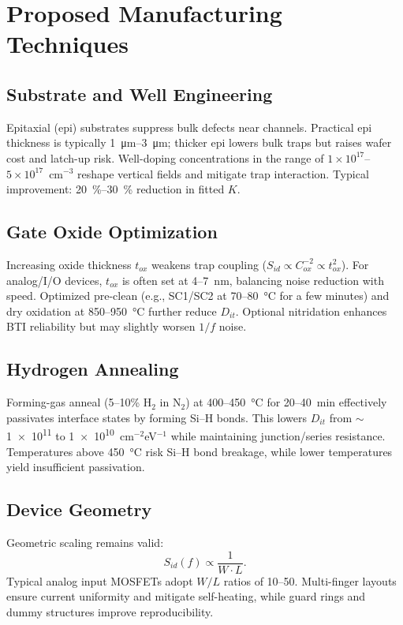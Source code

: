 \documentclass[conference]{IEEEtran}
\begin{document}
\section{Proposed Manufacturing Techniques}

\subsection{Substrate and Well Engineering}
Epitaxial (epi) substrates suppress bulk defects near channels. 
Practical epi thickness is typically \SIrange{1}{3}{\micro\meter}; thicker epi lowers bulk traps but raises wafer cost and latch-up risk. 
Well-doping concentrations in the range of $1\times10^{17}$--$5\times10^{17}$~cm$^{-3}$ reshape vertical fields and mitigate trap interaction. 
Typical improvement: \SI{20}{\percent}--\SI{30}{\percent} reduction in fitted $K$.

\subsection{Gate Oxide Optimization}
Increasing oxide thickness $t_{ox}$ weakens trap coupling 
($S_{id}\!\propto\! C_{ox}^{-2}\!\propto\! t_{ox}^{2}$). 
For analog/I/O devices, $t_{ox}$ is often set at 4--7~nm, balancing noise reduction with speed. 
Optimized pre-clean (e.g., SC1/SC2 at 70--80~\si{\celsius} for a few minutes) and dry oxidation at 850--950~\si{\celsius} further reduce $D_{it}$. 
Optional nitridation enhances BTI reliability but may slightly worsen $1/f$ noise.

\subsection{Hydrogen Annealing}
Forming-gas anneal (5--10\% H$_2$ in N$_2$) at 400--450~\si{\celsius} for 20--40~min effectively passivates interface states by forming Si--H bonds. 
This lowers $D_{it}$ from $\sim$\num{1e11} to \num{1e10}~cm$^{-2}$eV$^{-1}$ while maintaining junction/series resistance. 
Temperatures above 450~\si{\celsius} risk Si--H bond breakage, while lower temperatures yield insufficient passivation.

\subsection{Device Geometry}
Geometric scaling remains valid:
\begin{equation}
  S_{id}(f) \propto \frac{1}{W\cdot L}.
\end{equation}
Typical analog input MOSFETs adopt $W/L$ ratios of 10--50. 
Multi-finger layouts ensure current uniformity and mitigate self-heating, while guard rings and dummy structures improve reproducibility.
\end{document}

